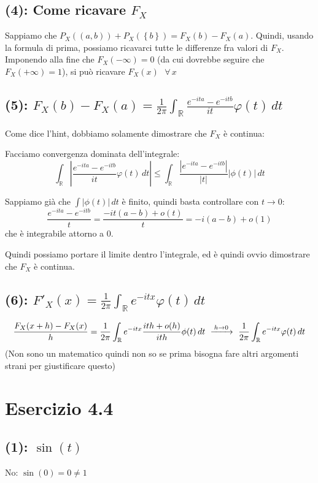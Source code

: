 \documentclass{article}
\newcommand{\myrightarrow}[1]{\xrightarrow{\makebox[2em][c]{$\scriptstyle#1$}}}
\begin{document}
\subsection{(4): Come ricavare $F_X$}
Sappiamo che $P_X((a,b)) + P_X(\left\{b\right\}) = F_X(b) - F_X(a)$. Quindi, usando la formula di prima, possiamo ricavarci tutte le differenze fra valori di $F_X$. Imponendo alla fine che $F_X(-\infty ) = 0$ (da cui dovrebbe seguire che $F_X(+\infty ) = 1$), si può ricavare $F_X\left(x\right) \ \ \ \forall \,x$

\subsection{(5): $F_X(b) - F_X(a) = \frac{1}{2\pi }\int_{\mathbb{R}} \frac{e^{-ita} - e^{-itb}}{it} \varphi (t) \,dt$}
Come dice l'hint, dobbiamo solamente dimostrare che $F_X$ è continua:

Facciamo convergenza dominata dell'integrale:
\[
	\int_{\mathbb{R}} \left|\frac{e^{-ita} - e^{-itb}}{it} \varphi (t) \,dt\right| \leq  \int_{\mathbb{R}} \frac{\left|e^{-ita} - e^{-itb}\right|}{|t|} \left|\phi (t)\right|\,dt
\]

Sappiamo già che $\int| \phi (t) | \,dt$ è finito, quindi basta controllare con $t \rightarrow 0$:
\[
	\frac{e^{-ita}-e^{-itb}}{t} = \frac{-it(a-b) + o(t)}{t} = -i(a-b) + o(1)
\]
che è integrabile attorno a 0.

Quindi possiamo portare il limite dentro l'integrale, ed è quindi ovvio dimostrare che $F_X$ è continua.

\subsection{(6): $F'_X(x) = \frac{1}{2\pi }\int_{\mathbb{R}} e^{-itx}\varphi (t)\,dt$}
\[
	\frac{F_X(x+h) - F_X(x)}{h} = \frac{1}{2\pi }\int_\mathbb{R} e^{-itx} \frac{ith + o(h)}{ith}\phi (t)\,dt \ \myrightarrow{h\rightarrow 0}\  \frac{1}{2\pi }\int_{\mathbb{R}} e^{-itx}\varphi (t)\,dt
\]
(Non sono un matematico quindi non so se prima bisogna fare altri argomenti strani per giustificare questo)

\section{Esercizio 4.4}
\subsection{(1): $\sin(t)$}
No: $\sin(0)=0 \neq 1$
\end{document}
